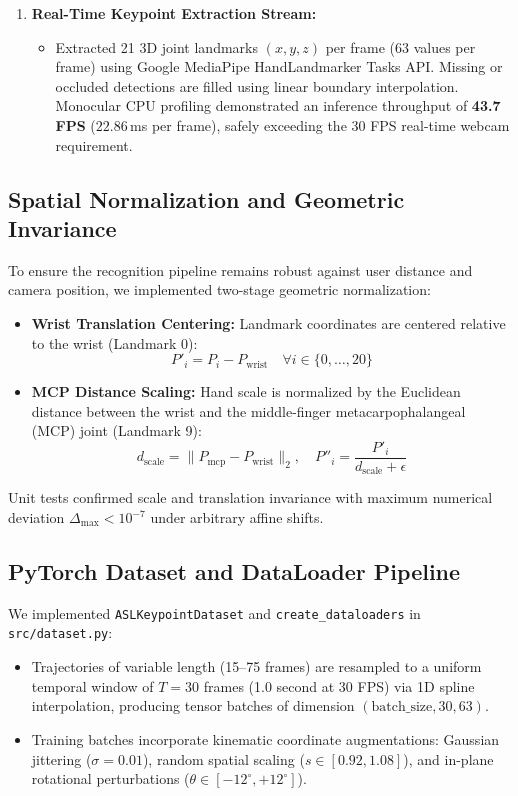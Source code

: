 \documentclass{article}
\begin{document}
\begin{enumerate}
    \item \textbf{Real-Time Keypoint Extraction Stream:}
    \begin{itemize}
        \item Extracted 21 3D joint landmarks $(x, y, z)$ per frame ($63$ values per frame) using Google MediaPipe HandLandmarker Tasks API. Missing or occluded detections are filled using linear boundary interpolation. Monocular CPU profiling demonstrated an inference throughput of \textbf{43.7 FPS} ($22.86$\,ms per frame), safely exceeding the 30 FPS real-time webcam requirement.
    \end{itemize}
\end{enumerate}

\subsection*{Spatial Normalization and Geometric Invariance}
To ensure the recognition pipeline remains robust against user distance and camera position, we implemented two-stage geometric normalization:
\begin{itemize}
    \item \textbf{Wrist Translation Centering:} Landmark coordinates are centered relative to the wrist (Landmark 0):
    \[
        P'_i = P_i - P_{\text{wrist}} \quad \forall i \in \{0, \dots, 20\}
    \]
    \item \textbf{MCP Distance Scaling:} Hand scale is normalized by the Euclidean distance between the wrist and the middle-finger metacarpophalangeal (MCP) joint (Landmark 9):
    \[
        d_{\text{scale}} = \| P_{\text{mcp}} - P_{\text{wrist}} \|_2, \quad P''_i = \frac{P'_i}{d_{\text{scale}} + \epsilon}
    \]
\end{itemize}
Unit tests confirmed scale and translation invariance with maximum numerical deviation $\Delta_{\max} < 10^{-7}$ under arbitrary affine shifts.

\subsection*{PyTorch Dataset and DataLoader Pipeline}
We implemented \texttt{ASLKeypointDataset} and \texttt{create\_dataloaders} in \texttt{src/dataset.py}:
\begin{itemize}
    \item Trajectories of variable length (15--75 frames) are resampled to a uniform temporal window of $T = 30$ frames (1.0 second at 30 FPS) via 1D spline interpolation, producing tensor batches of dimension $(\text{batch\_size}, 30, 63)$.
    \item Training batches incorporate kinematic coordinate augmentations: Gaussian jittering ($\sigma = 0.01$), random spatial scaling ($s \in [0.92, 1.08]$), and in-plane rotational perturbations ($\theta \in [-12^\circ, +12^\circ]$).
\end{itemize}
\end{document}
